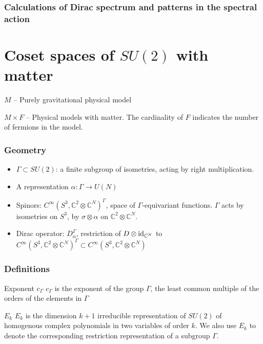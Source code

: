 \documentclass{beamer}
\def\C{{\mathbb C}}
\def\id{{\rm id}}
\begin{document}
\begin{frame}
	\frametitle{Calculations of Dirac spectrum and patterns in the spectral action}
\end{frame}

\section{Coset spaces of $SU(2)$ with matter}

\begin{frame}
  \begin{block}{}
    $M$ -- Purely gravitational physical model
  \end{block}

  \begin{block}{}
    $M \times F$ -- Physical models with matter. The cardinality of $F$ indicates the number of fermions in the model.
  \end{block} 
\end{frame}

\begin{frame}
	\frametitle{Geometry}
	\begin{itemize}
	\item $\Gamma \subset SU(2)$: a finite subgroup of isometries, acting by right multiplication.
	
	\item A representation $\alpha : \Gamma \rightarrow U(N)$
	
	\item Spinors: $C^{\infty}(S^3,\C^2 \otimes \C^N)^{\Gamma}$, space of $\Gamma$-equivariant functions. $\Gamma$ acts by isometries on $S^3$, by $\sigma \otimes \alpha$ on $\C^2 \otimes \C ^N$.
	
	\item Dirac operator: $D_{\alpha}^{\Gamma}$, restriction of $D\otimes \id_{\C ^N}$ to $C^{\infty}(S^3,\C^2 \otimes \C^N)^{\Gamma} \subset C^{\infty}(S^3,\C^2 \otimes \C^N)$
	\end{itemize}
\end{frame}

\begin{frame}
\frametitle{Definitions}
\begin{block}{Exponent $c_{\Gamma}$}
$c_{\Gamma}$ is the exponent of the group $\Gamma$, the least common multiple of the orders of the elements in $\Gamma$
\end{block}
\begin{block}{$E_k$}
$E_k$ is the dimension $k+1$ irreducible representation of $SU(2)$ of homogenous complex polynomials in two variables of order $k$. We also use $E_k$ to denote the corresponding restriction representation of a subgroup $\Gamma$.
\end{block}
\end{frame}
\end{document}
